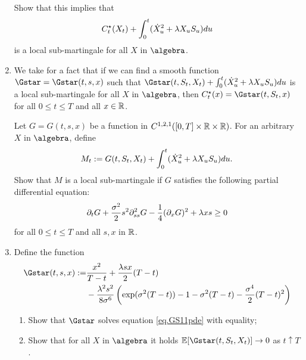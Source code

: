 \documentclass[10pt,a4paper]{article}
\begin{document}
\begin{exercise}
\begin{enumerate}[label={\textbf{\ref{ex.GS11}.\arabic{*}}}, ref={Exercise {\ref{ex.GS11}.\arabic{*}}}]
\begin{equation}
    \end{equation}
    Show that this implies that 
    \begin{equation*}
    C^{\star}_t(X_t) + \int_{0}^{t} (\dot{X}_{u}^{2} + \lambda X_u S_u )du
    \end{equation*}
    is a local sub-martingale for all $X$ in $\algebra$. 
  \item 
    We take for a fact that if we can find a smooth function $\Gstar=\Gstar(t, s, x)$ such that 
    $\Gstar(t,\price_t,  X_t) + \int_{0}^{t} (\dot{X}_{u}\squared + \lambda X_u \price_u )du$
    is a local sub-martingale for all $X$ in $\algebra$, 
    then 
    $C^{\star}_t(x) = \Gstar(t, \price_t, x)$ for all $0\leq t \leq T$ and all $x\in\mathbb{R}$. 

    Let $G=G(t, s, x)$ be a function in $C^{1, 2, 1}([0,T]\times \mathbb{R} \times \mathbb{R})$. 
    For an arbitrary $X$ in $\algebra$, define 
    \begin{equation*}
      M_t : = G(t, S_t, X_t) + \int_{0}^{t} (\dot{X}_{u}^{2} + \lambda X_u S_u )du.
    \end{equation*}
    Show that $M$ is a local sub-martingale
    if $G$ satisfies the following partial differential equation:
    \begin{equation}
      \label{eq.GS11pde}
      \partial_t G + \frac{\sigma\squared}{2} s\squared \partial_{ss}\squared G
      -\frac{1}{4} (\partial_x G)\squared + \lambda xs
      \geq 0 
    \end{equation}
    for all $0\leq t \leq T$ and all $s, x$ in $\mathbb{R}$.
  \item 
    Define the function 
    \begin{equation}
      \label{eq.Gstar}
      \begin{split}
        \Gstar(t, s, x):=&
      \frac{x\squared}{T-t}
      +\frac{\lambda s x }{2}(T-t) 
      \\
      &
      -\frac{\lambda\squared s\squared}{8 \sigma^{6}}
      \left(
      \exp(\sigma\squared(T-t))
      -1 - \sigma\squared(T-t) - \frac{\sigma^{4}}{2}(T-t)\squared
      \right)
      \end{split}
    \end{equation}
    \begin{enumerate}
      \item Show that $\Gstar$ solves equation \eqref{eq.GS11pde} with equality;
      \item Show that for all $X$ in $\algebra$ it holds 
        $\Expectation[\Gstar(t, \price_t, X_t)] \rightarrow 0 $ as $t\uparrow T$. 

\end{enumerate}
\end{enumerate}
\end{exercise}
\end{document}
